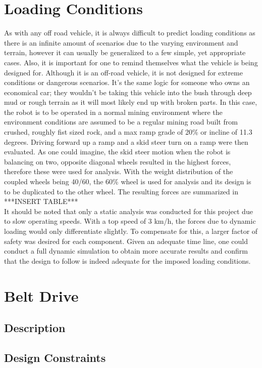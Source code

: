 \section{Loading Conditions}
As with any off road vehicle, it is always difficult to predict loading conditions as there is an infinite amount of scenarios due to the varying environment and terrain, however it can usually be generalized to a few simple, yet appropriate cases. Also, it is important for one to remind themselves what the vehicle is being designed for. Although it is an off-road vehicle, it is not designed for extreme conditions or dangerous scenarios. It's the same logic for someone who owns an economical car; they wouldn't be taking this vehicle into the bush through deep mud or rough terrain as it will most likely end up with broken parts. In this case, the robot is to be operated in a normal mining environment where the environment conditions are assumed to be a regular mining road built from crushed, roughly fist sized rock, and a max ramp grade of 20\% or incline of 11.3 degrees. Driving forward up a ramp and a skid steer turn on a ramp were then evaluated. As one could imagine, the skid steer motion when the robot is balancing on two, opposite diagonal wheels resulted in the highest forces, therefore these were used for analysis. With the weight distribution of the coupled wheels being 40/60, the 60\% wheel is used for analysis and its design is to be duplicated to the other wheel. The resulting forces are summarized in     
\\
 ***INSERT TABLE***
\\
It should be noted that only a static analysis was conducted for this project due to slow operating speeds. With a top speed of 3 km/h, the forces due to dynamic loading would only differentiate slightly. To compensate for this, a larger factor of safety was desired for each component. Given an adequate time line, one could conduct a full dynamic simulation to obtain more accurate results and confirm that the design to follow is indeed adequate for the imposed loading conditions. 

\section{Belt Drive}
\subsection{Description}
\subsection{Design Constraints}
